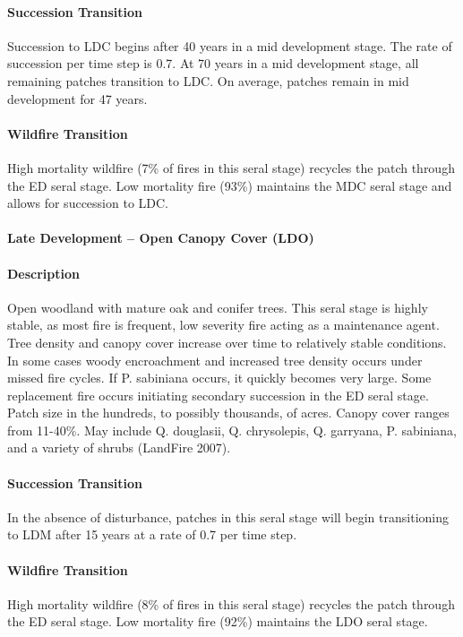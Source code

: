 \paragraph{Succession Transition} Succession to LDC begins after 40 years in a mid development stage. The rate of succession per time step is 0.7. At 70 years in a mid development stage, all remaining patches transition to LDC. On average, patches remain in mid development for 47 years.

\paragraph{Wildfire Transition} High mortality wildfire (7\% of fires in this seral stage) recycles the patch through the ED seral stage. Low mortality fire (93\%) maintains the MDC seral stage and allows for succession to LDC.

\noindent\hrulefill


\paragraph{Late Development – Open Canopy Cover (LDO)}

\paragraph{Description} Open woodland with mature oak and conifer trees. This seral stage is highly stable, as most fire is frequent, low severity fire acting as a maintenance agent. Tree density and canopy cover increase over time to relatively stable conditions. In some cases woody encroachment and increased tree density occurs under missed fire cycles. If P. sabiniana occurs, it quickly becomes very large. Some replacement fire occurs initiating secondary succession in the ED seral stage. Patch size in the hundreds, to possibly thousands, of acres. Canopy cover ranges from 11-40\%. May include Q. douglasii, Q. chrysolepis, Q. garryana, P. sabiniana, and a variety of shrubs (LandFire 2007).

\paragraph{Succession Transition} In the absence of disturbance, patches in this seral stage will begin transitioning to LDM after 15 years at a rate of 0.7 per time step. 

\paragraph{Wildfire Transition} High mortality wildfire (8\% of fires in this seral stage) recycles the patch through the ED seral stage. Low mortality fire (92\%) maintains the LDO seral stage.

